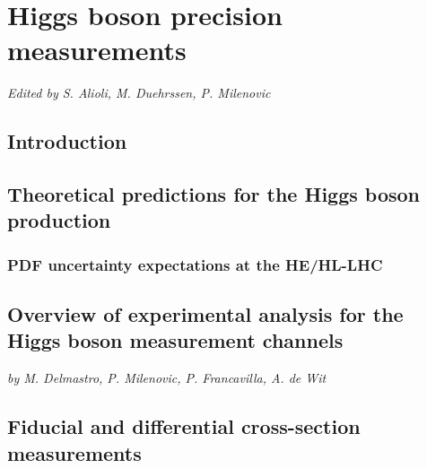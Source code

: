 \documentclass[../report.tex]{subfiles}
\providecommand{\main}{..}
\begin{document}
\section{Higgs boson precision measurements\label{sec2}}
\begin{center}{\it Edited by S. Alioli, M. Duehrssen, P. Milenovic} \end{center}
\subsection{Introduction}
\label{sec2:introduction}


\subsection{Theoretical predictions for the Higgs boson production}
\label{sec2_HXSWG1}


\subsubsection{PDF uncertainty expectations at the HE/HL-LHC}
\label{sec2:PDFuncertainties}


\subsection{Overview of experimental analysis for the Higgs boson measurement channels}
\label{sec2:expan}
\begin{center} {\it by M. Delmastro, P. Milenovic, P. Francavilla, A. de Wit} \end{center}
\label{sec2:channels}


\subsection{Fiducial and differential cross-section measurements}
\label{sec2:fiducial}


\end{document}
